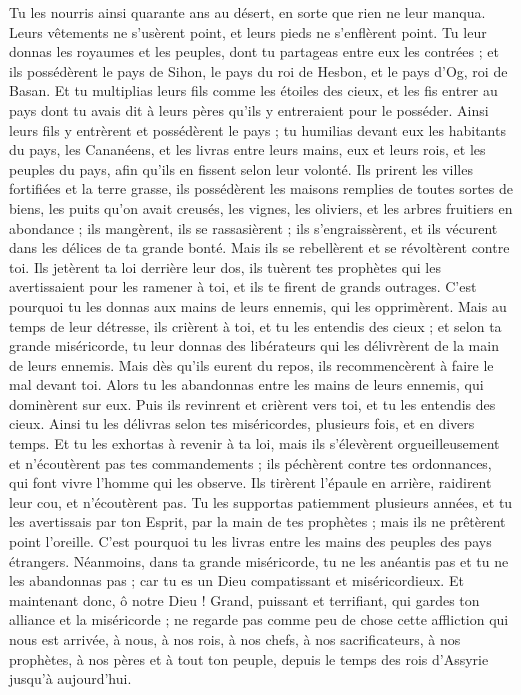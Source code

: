 \begin{multicols}{2}
Tu les nourris ainsi quarante ans au désert, en sorte que rien ne leur manqua. Leurs vêtements ne s'usèrent point, et leurs pieds ne s'enflèrent point.
Tu leur donnas les royaumes et les peuples, dont tu partageas entre eux les contrées ; et ils possédèrent le pays de Sihon, le pays du roi de Hesbon, et le pays d’Og, roi de Basan.
Et tu multiplias leurs fils comme les étoiles des cieux, et les fis entrer au pays dont tu avais dit à leurs pères qu'ils y entreraient pour le posséder.
Ainsi leurs fils y entrèrent et possédèrent le pays ; tu humilias devant eux les habitants du pays, les Cananéens, et les livras entre leurs mains, eux et leurs rois, et les peuples du pays, afin qu'ils en fissent selon leur volonté.
Ils prirent les villes fortifiées et la terre grasse, ils possédèrent les maisons remplies de toutes sortes de biens, les puits qu'on avait creusés, les vignes, les oliviers, et les arbres fruitiers en abondance ; ils mangèrent, ils se rassasièrent ; ils s'engraissèrent, et ils vécurent dans les délices de ta grande bonté.
Mais ils se rebellèrent et se révoltèrent contre toi. Ils jetèrent ta loi derrière leur dos, ils tuèrent tes prophètes qui les avertissaient pour les ramener à toi, et ils te firent de grands outrages.
C'est pourquoi tu les donnas aux mains de leurs ennemis, qui les opprimèrent. Mais au temps de leur détresse, ils crièrent à toi, et tu les entendis des cieux ; et selon ta grande miséricorde, tu leur donnas des libérateurs qui les délivrèrent de la main de leurs ennemis.
Mais dès qu'ils eurent du repos, ils recommencèrent à faire le mal devant toi. Alors tu les abandonnas entre les mains de leurs ennemis, qui dominèrent sur eux. Puis ils revinrent et crièrent vers toi, et tu les entendis des cieux. Ainsi tu les délivras selon tes miséricordes, plusieurs fois, et en divers temps.
Et tu les exhortas à revenir à ta loi, mais ils s’élevèrent  orgueilleusement et n'écoutèrent pas tes commandements ;  ils péchèrent contre tes ordonnances, qui font vivre l’homme qui les observe. Ils tirèrent l'épaule en arrière, raidirent leur cou, et n'écoutèrent pas.
Tu les supportas patiemment plusieurs années, et tu les avertissais par ton Esprit, par la main de tes prophètes ; mais ils ne prêtèrent point l'oreille. C’est pourquoi tu les livras entre les mains des peuples des pays étrangers.
Néanmoins, dans ta grande miséricorde, tu ne les anéantis pas et tu ne les abandonnas pas ; car tu es un Dieu compatissant et miséricordieux.
Et maintenant donc, ô notre Dieu ! Grand, puissant et terrifiant, qui gardes ton alliance et la miséricorde ; ne regarde pas comme peu de chose cette affliction qui nous est arrivée, à nous, à nos rois, à nos chefs, à nos sacrificateurs, à nos prophètes, à nos pères et à tout ton peuple, depuis le temps des rois d'Assyrie jusqu'à aujourd'hui.

\end{multicols}
